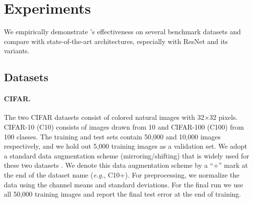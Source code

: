 \section{Experiments}



\label{sec:results}
\label{sec:experiment-results}
  We empirically demonstrate \methodnameshort{}'s effectiveness on several benchmark datasets
  and compare with state-of-the-art architectures, especially with ResNet and its variants.

\subsection{Datasets}
\paragraph{CIFAR.}
      The two CIFAR datasets \cite{cifar} consist of colored natural images with 32$\times$32 pixels. CIFAR-10 (C10) consists of images drawn from 10 and CIFAR-100 (C100) from 100 classes. The training and test sets contain 50,000 and 10,000 images respectively, and we hold out 5,000 training images as a validation set.
      We adopt a standard data augmentation scheme (mirroring/shifting) that is widely used for these two datasets \cite{resnet, stochastic, fractalnet, netinnet, fitnet, dsn, allcnn, highway}. We denote this data augmentation scheme by a ``+'' mark at the end of the dataset name (\emph{e.g.}, C10+). For preprocessing, we normalize the data using the channel means and standard deviations. For the final run we use all 50,000 training images and report the final test error at the end of training.

\vspace{-2 ex}
